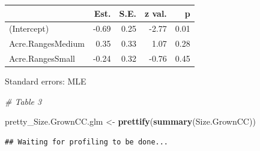 \documentclass[12pt,]{article}
\newenvironment{Shaded}{\begin{snugshade}}{\end{snugshade}}
\newcommand{\KeywordTok}[1]{\textcolor[rgb]{0.13,0.29,0.53}{\textbf{#1}}}
\newcommand{\DataTypeTok}[1]{\textcolor[rgb]{0.13,0.29,0.53}{#1}}
\newcommand{\DecValTok}[1]{\textcolor[rgb]{0.00,0.00,0.81}{#1}}
\newcommand{\StringTok}[1]{\textcolor[rgb]{0.31,0.60,0.02}{#1}}
\newcommand{\CommentTok}[1]{\textcolor[rgb]{0.56,0.35,0.01}{\textit{#1}}}
\newcommand{\OtherTok}[1]{\textcolor[rgb]{0.56,0.35,0.01}{#1}}
\newcommand{\OperatorTok}[1]{\textcolor[rgb]{0.81,0.36,0.00}{\textbf{#1}}}
\newcommand{\NormalTok}[1]{#1}
\begin{document}
\begin{table}[!h]
\centering
\begin{threeparttable}
\begin{tabular}{lrrrr}
\toprule
  & Est. & S.E. & z val. & p\\
\midrule
\rowcolor{gray!6}  (Intercept) & -0.69 & 0.25 & -2.77 & 0.01\\
Acre.RangesMedium & 0.35 & 0.33 & 1.07 & 0.28\\
\rowcolor{gray!6}  Acre.RangesSmall & -0.24 & 0.32 & -0.76 & 0.45\\
\bottomrule
\end{tabular}
\begin{tablenotes}
\item Standard errors: MLE
\end{tablenotes}
\end{threeparttable}
\end{table}

\begin{Shaded}
\begin{Highlighting}[]
\CommentTok{# Table 3}

\NormalTok{pretty_Size.GrownCC.glm <-}\StringTok{ }\KeywordTok{prettify}\NormalTok{(}\KeywordTok{summary}\NormalTok{(Size.GrownCC))}
\end{Highlighting}
\end{Shaded}

\begin{verbatim}
## Waiting for profiling to be done...
\end{verbatim}

\begin{Shaded}
\end{Shaded}
\end{document}
